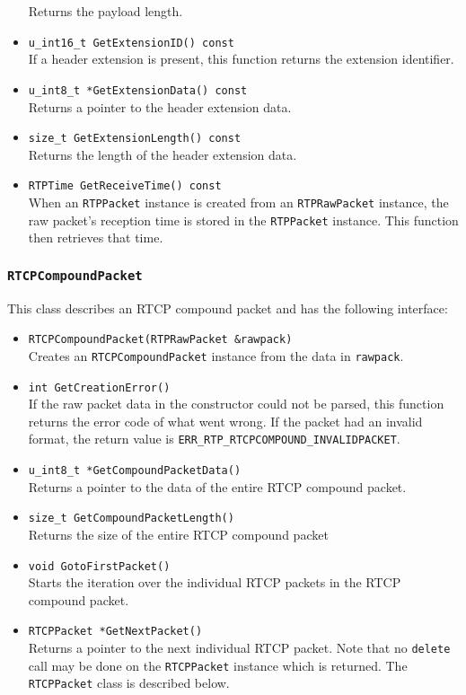 \documentclass[12pt,a4paper]{article}
\newcommand{\headerfile}[1]{\marginpar{\scriptsize Header:\\{\tt #1}}}
\begin{document}
\begin{itemize}
						Returns the payload length.
					\item {\tt u\_int16\_t GetExtensionID() const}\\
						If a header extension is present, this function
						returns the extension identifier.
					\item {\tt u\_int8\_t *GetExtensionData() const}\\
						Returns a pointer to the header extension data.
					\item {\tt size\_t GetExtensionLength() const}\\
						Returns the length of the header extension data.
					\item {\tt RTPTime GetReceiveTime() const}\\
						When an {\tt RTPPacket} instance is created from 
						an {\tt RTPRawPacket} instance, the raw packet's 
						reception time is stored in the {\tt RTPPacket}
						instance. This function then retrieves that time.
				\end{itemize}

			\subsubsection{\tt RTCPCompoundPacket}\headerfile{rtpcompoundpacket.h}

				This class describes an RTCP compound packet and has the following
				interface:
				\begin{itemize}
					\item {\tt RTCPCompoundPacket(RTPRawPacket \&rawpack)}\\
						Creates an {\tt RTCPCompoundPacket} instance from the
						data in {\tt rawpack}.
					\item {\tt int GetCreationError()}\\
						If the raw packet data in the constructor could not
						be parsed, this function returns the error code of
						what went wrong. If the packet had an invalid format,
						the return value is {\tt ERR\_\-RTP\_\-RTCPCOMPOUND\_\-INVALID\-PACKET}.
					\item {\tt u\_int8\_t *GetCompoundPacketData()}\\
						Returns a pointer to the data of the entire RTCP compound packet.
					\item {\tt size\_t GetCompoundPacketLength()}\\
						Returns the size of the entire RTCP compound packet
					\item {\tt void GotoFirstPacket()}\\
						Starts the iteration over the individual RTCP packets in
						the RTCP compound packet.
					\item {\tt RTCPPacket *GetNextPacket()}\\
						Returns a pointer to the next individual RTCP packet. Note
						that no {\tt delete} call may be done on the {\tt RTCPPacket}
						instance which is returned. The {\tt RTCPPacket} class is
						described below.
				\end{itemize}
				
\end{document}
